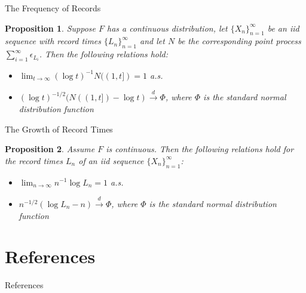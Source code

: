 \documentclass{beamer}
\newtheorem{proposition}{Proposition}
\begin{document}
\begin{frame}{The Frequency of Records}
    \begin{proposition}
        Suppose $F$ has a continuous distribution, let $\{X_n\}_{n = 1}^{\infty}$ be an iid sequence with record times $\{L_n\}_{n = 1}^{\infty}$ and let $N$ be the corresponding point process $\sum_{i = 1}^{\infty} \epsilon_{L_i}$. Then the following relations hold:
        \begin{itemize}
            \item $\lim_{t \to \infty} (\log t)^{-1}N((1, t]) = 1$ a.s.
            \item $(\log t)^{-1 / 2}(N((1, t]) - \log t) \xrightarrow{d} \Phi$, where $\Phi$ is the standard normal distribution function
        \end{itemize}
    \end{proposition}
\end{frame}

\begin{frame}{The Growth of Record Times}
    \begin{proposition}
        Assume $F$ is continuous. Then the following relations hold for the record times $L_n$ of an iid sequence $\{X_n\}_{n = 1}^{\infty}$:
        \begin{itemize}
            \item $\lim_{n \to \infty} n^{-1}\log L_n = 1$ a.s.
            \item $n^{-1 / 2}(\log L_n - n) \xrightarrow{d} \Phi$, where $\Phi$ is the standard normal distribution function
        \end{itemize}
    \end{proposition}
\end{frame}

\section{References}

\begin{frame}[allowframebreaks]{References}
    \nocite{*}
    \printbibliography
\end{frame}
\end{document}
